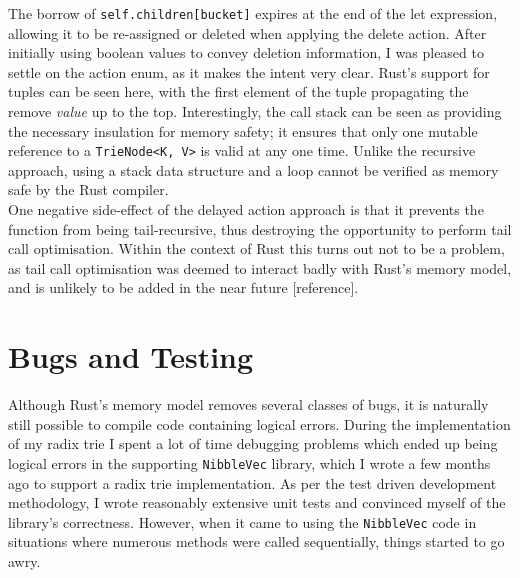 \documentclass[a4paper,12pt]{article}
\newcommand{\code}{\texttt}
\begin{document}
The borrow of \code{self.children[bucket]} expires at the end of the let expression, allowing it to be re-assigned or deleted when applying the delete action. After initially using boolean values to convey deletion information, I was pleased to settle on the action enum, as it makes the intent very clear. Rust's support for tuples can be seen here, with the first element of the tuple propagating the remove \textit{value} up to the top. Interestingly, the call stack can be seen as providing the necessary insulation for memory safety; it ensures that only one mutable reference to a \code{TrieNode<K, V>} is valid at any one time. Unlike the recursive approach, using a stack data structure and a loop cannot be verified as memory safe by the Rust compiler.\\

One negative side-effect of the delayed action approach is that it prevents the function from being tail-recursive, thus destroying the opportunity to perform tail call optimisation. Within the context of Rust this turns out not to be a problem, as tail call optimisation was deemed to interact badly with Rust's memory model, and is unlikely to be added in the near future [reference].

\section{Bugs and Testing}

Although Rust's memory model removes several classes of bugs, it is naturally still possible to compile code containing logical errors. During the implementation of my radix trie I spent a lot of time debugging problems which ended up being logical errors in the supporting \code{NibbleVec} library, which I wrote a few months ago to support a radix trie implementation. As per the test driven development methodology, I wrote reasonably extensive unit tests and convinced myself of the library's correctness. However, when it came to using the \code{NibbleVec} code in situations where numerous methods were called sequentially, things started to go awry.\\
\end{document}
